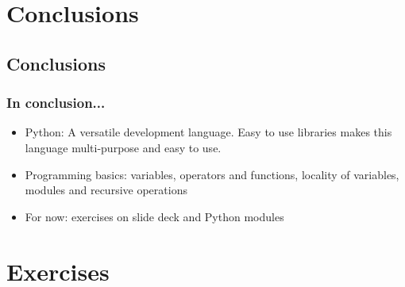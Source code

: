 \section{Conclusions}
\subsection*{Conclusions}
\begin{frame}[fragile]
  \frametitle{In conclusion...}
  \begin{itemize}
     \item Python: A versatile development language. Easy to use libraries makes this language multi-purpose and easy to use.
     \item Programming basics: variables, operators and functions, locality of variables, modules and recursive operations
  \end{itemize}
  \pause
    \begin{itemize}
     \item For now: exercises on slide deck and Python modules
  \end{itemize}
\end{frame}

\section{Exercises}
